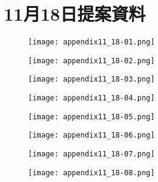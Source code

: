\chapter{11月18日提案資料}
\begin{figure}[ht]
    \begin{center}
      \texttt{[image: appendix11\_18-01.png]}
    \end{center}
\end{figure}

\begin{figure}[ht]
    \begin{center}
    \texttt{[image: appendix11\_18-02.png]}
    \end{center}
\end{figure}

\begin{figure}[ht]
    \begin{center}
      \texttt{[image: appendix11\_18-03.png]}
    \end{center}
\end{figure}

\begin{figure}[ht]
    \begin{center}
    \texttt{[image: appendix11\_18-04.png]}
    \end{center}
\end{figure}

\begin{figure}[ht]
    \begin{center}
      \texttt{[image: appendix11\_18-05.png]}
    \end{center}
\end{figure}

\begin{figure}[ht]
    \begin{center}
    \texttt{[image: appendix11\_18-06.png]}
    \end{center}
\end{figure}

\begin{figure}[ht]
    \begin{center}
      \texttt{[image: appendix11\_18-07.png]}
    \end{center}
\end{figure}

\begin{figure}[ht]
    \begin{center}
    \texttt{[image: appendix11\_18-08.png]}
    \end{center}
\end{figure}

